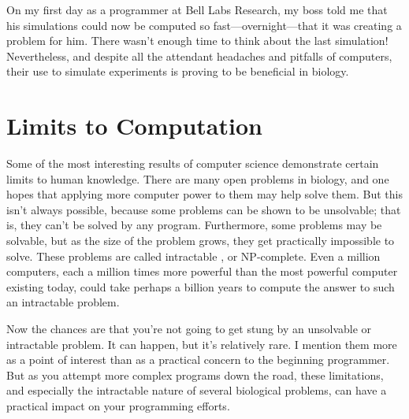 On my first day as a programmer at Bell Labs Research, my boss told me that his simulations could now be computed so fast—overnight—that it was creating a problem for him. There wasn't enough time to think about the last simulation! Nevertheless, and despite all the attendant headaches and pitfalls of computers, their use to simulate experiments is proving to be beneficial in biology. 

\section{Limits to Computation}
Some of the most interesting results of computer science demonstrate certain limits to human knowledge. There are many open problems in biology, and one hopes that applying more computer power to them may help solve them. But this isn't always possible, because some problems can be shown to be unsolvable; that is, they can't be solved by any program. Furthermore, some problems may be solvable, but as the size of the problem grows, they get practically impossible to solve. These problems are called intractable , or NP-complete. Even a million computers, each a million times more powerful than the most powerful computer existing today, could take perhaps a billion years to compute the answer to such an intractable problem.

Now the chances are that you're not going to get stung by an unsolvable or intractable problem. It can happen, but it's relatively rare. I mention them more as a point of interest than as a practical concern to the beginning programmer. But as you attempt more complex programs down the road, these limitations, and especially the intractable nature of several biological problems, can have a practical impact on your programming efforts. 

